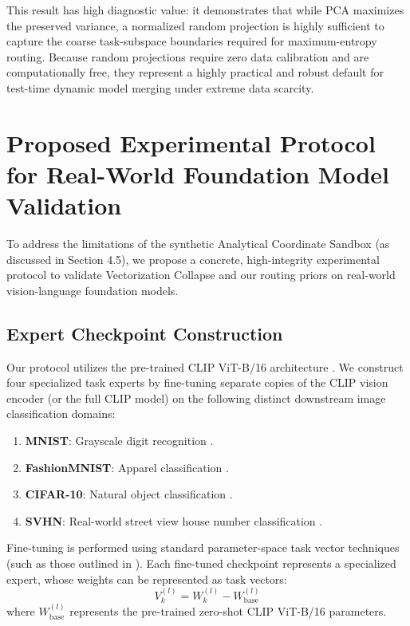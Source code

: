 \documentclass{article}
\theoremstyle{plain}
\theoremstyle{definition}
\theoremstyle{remark}
\begin{document}
This result has high diagnostic value: it demonstrates that while PCA maximizes the preserved variance, a normalized random projection is highly sufficient to capture the coarse task-subspace boundaries required for maximum-entropy routing. Because random projections require zero data calibration and are computationally free, they represent a highly practical and robust default for test-time dynamic model merging under extreme data scarcity.

\section{Proposed Experimental Protocol for Real-World Foundation Model Validation}
\label{app:realworld}
To address the limitations of the synthetic Analytical Coordinate Sandbox (as discussed in Section 4.5), we propose a concrete, high-integrity experimental protocol to validate Vectorization Collapse and our routing priors on real-world vision-language foundation models.

\subsection{Expert Checkpoint Construction}
Our protocol utilizes the pre-trained CLIP ViT-B/16 architecture \cite{radford2021learning}. We construct four specialized task experts by fine-tuning separate copies of the CLIP vision encoder (or the full CLIP model) on the following distinct downstream image classification domains:
\begin{enumerate}
    \item \textbf{MNIST}: Grayscale digit recognition \cite{lecun1998gradient}.
    \item \textbf{FashionMNIST}: Apparel classification \cite{xiao2017fashion}.
    \item \textbf{CIFAR-10}: Natural object classification \cite{krizhevsky2009learning}.
    \item \textbf{SVHN}: Real-world street view house number classification \cite{netzer2011reading}.
\end{enumerate}
Fine-tuning is performed using standard parameter-space task vector techniques (such as those outlined in \cite{ilharco2022editing}). Each fine-tuned checkpoint represents a specialized expert, whose weights can be represented as task vectors:
\begin{equation}
    V_k^{(l)} = W_k^{(l)} - W_{\text{base}}^{(l)}
\end{equation}
where $W_{\text{base}}^{(l)}$ represents the pre-trained zero-shot CLIP ViT-B/16 parameters.
\end{document}
